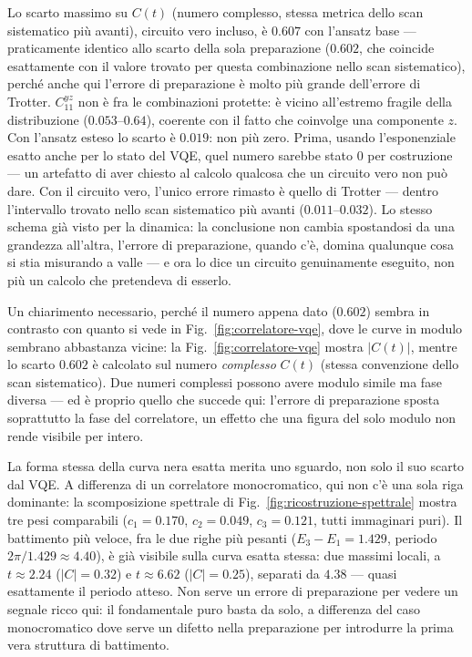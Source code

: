 \documentclass[11pt,a4paper]{article}
\begin{document}
Lo scarto massimo su $C(t)$ (numero complesso, stessa metrica dello scan
sistematico più avanti), circuito vero incluso, è $0.607$ con l'ansatz
base --- praticamente identico allo scarto della sola preparazione
($0.602$, che coincide esattamente con il valore trovato per questa
combinazione nello scan sistematico), perché anche qui l'errore di
preparazione è molto più grande dell'errore di Trotter. $C_{11}^{yz}$ non
è fra le combinazioni protette: è vicino all'estremo fragile della
distribuzione ($0.053$--$0.64$), coerente con il fatto che coinvolge una
componente $z$. Con l'ansatz esteso lo scarto è $0.019$: non più zero.
Prima, usando l'esponenziale esatto anche per lo stato del VQE, quel
numero sarebbe stato $0$ per costruzione --- un artefatto di aver
chiesto al calcolo qualcosa che un circuito vero non può dare. Con
il circuito vero, l'unico errore rimasto è quello di Trotter --- dentro
l'intervallo trovato nello scan sistematico più avanti
($0.011$--$0.032$).
Lo stesso schema già visto per la dinamica: la conclusione non cambia
spostandosi da una grandezza all'altra, l'errore di preparazione, quando
c'è, domina qualunque cosa si stia misurando a valle --- e ora lo dice un
circuito genuinamente eseguito, non più un calcolo che pretendeva di
esserlo.

Un chiarimento necessario, perché il numero appena dato ($0.602$) sembra
in contrasto con quanto si vede in Fig.~\ref{fig:correlatore-vqe}, dove le
curve in modulo sembrano abbastanza vicine: la Fig.~\ref{fig:correlatore-vqe}
mostra $|C(t)|$, mentre lo scarto $0.602$ è calcolato sul numero
\emph{complesso} $C(t)$ (stessa convenzione dello scan sistematico). Due
numeri complessi possono avere modulo simile ma fase diversa --- ed è
proprio quello che succede qui: l'errore di preparazione sposta
soprattutto la fase del correlatore, un effetto che una figura del solo
modulo non rende visibile per intero.

La forma stessa della curva nera esatta merita uno sguardo, non solo il suo
scarto dal VQE. A differenza di un correlatore monocromatico, qui non c'è
una sola riga dominante: la scomposizione spettrale di
Fig.~\ref{fig:ricostruzione-spettrale} mostra tre pesi comparabili
($c_1=0.170$, $c_2=0.049$, $c_3=0.121$, tutti immaginari puri). Il
battimento più veloce, fra le due righe più pesanti ($E_3-E_1=1.429$,
periodo $2\pi/1.429\approx4.40$), è già visibile sulla curva esatta
stessa: due massimi locali, a $t\approx2.24$ ($|C|=0.32$) e
$t\approx6.62$ ($|C|=0.25$), separati da $4.38$ --- quasi esattamente il
periodo atteso. Non serve un errore di preparazione per vedere un
segnale ricco qui: il fondamentale puro basta da solo, a differenza del
caso monocromatico dove serve un difetto nella preparazione per
introdurre la prima vera struttura di battimento.
\end{document}
